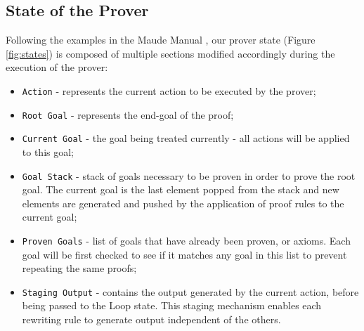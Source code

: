 \documentclass[12pt,a4paper]{article}
\begin{document}
{\subsection{State of the Prover}
Following the examples in the Maude Manual \cite{manual}, our prover state (Figure \ref{fig:states}) is composed of multiple sections modified accordingly during the execution of the prover:
\begin{itemize}
	\item{\texttt{Action} - represents the current action to be executed by the prover;}
	\item{\texttt{Root Goal} - represents the end-goal of the proof;}
	\item{\texttt{Current Goal} - the goal being treated currently - all actions will be applied to this goal;}
	\item{\texttt{Goal Stack} - stack of goals necessary to be proven in order to prove the root goal. The current goal is the last element popped from the stack and new elements are generated and pushed by the application of proof rules to the current goal;}
	\item{\texttt{Proven Goals} - list of goals that have already been proven, or axioms. Each goal will be first checked to see if it matches any goal in this list to prevent repeating the same proofs;}
	\item{\texttt{Staging Output} - contains the output generated by the current action, before being passed to the Loop state. This staging mechanism enables each rewriting rule to generate output independent of the others.}
\end{itemize}
}
\end{document}
